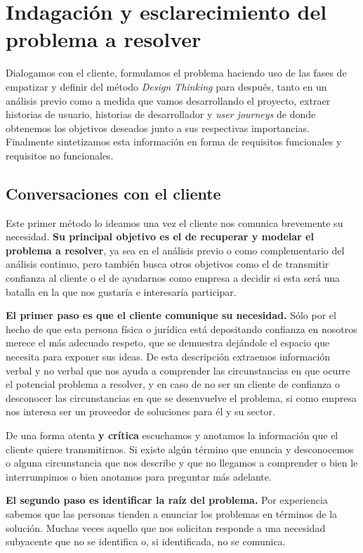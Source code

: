 \section{Indagación y esclarecimiento del problema a resolver}

Dialogamos con el cliente, formulamos el problema haciendo uso de las fases de
empatizar y definir del método \textit{Design Thinking} para después, tanto en un análisis
previo como a medida que vamos desarrollando el proyecto, extraer historias de usuario, historias de
desarrollador y \textit{user journeys} de donde obtenemos los objetivos deseados
junto a sus respectivas importancias.
Finalmente sintetizamos esta información en forma de requisitos funcionales y
requisitos no funcionales.

\subsection{Conversaciones con el cliente}

Este primer método lo ideamos una vez el cliente nos comunica brevemente su necesidad.
\textbf{Su principal objetivo es el de recuperar y modelar el problema a resolver}, ya sea en
el análisis previo o como complementario del análisis continuo, pero también busca
otros objetivos como el de transmitir confianza al cliente o el de ayudarnos como empresa a
decidir si esta será una batalla en la que nos gustaría e interesaría participar.

\textbf{El primer paso es que el cliente comunique su necesidad.} Sólo por el hecho de que esta
persona física o jurídica está depositando confianza en nosotros merece el más
adecuado respeto, que se demuestra dejándole el espacio que necesita para exponer
sus ideas. De esta descripción extraemos información verbal y
no verbal que nos ayuda a comprender las circunstancias en que ocurre el potencial
problema a resolver, y en caso de no ser un cliente de confianza o desconocer las
circunstancias en que se desenvuelve el problema, si como empresa nos interesa
ser un proveedor de soluciones para él y su sector.

De una forma atenta \textbf{y crítica} escuchamos y anotamos la información que el
cliente quiere transmitirnos. Si existe algún término que enuncia y desconocemos
o alguna circunstancia que nos describe y que no llegamos a comprender o bien le
interrumpimos o bien anotamos para preguntar más adelante.

\textbf{El segundo paso es identificar la raíz del problema.} Por experiencia sabemos
que las personas tienden a enunciar los problemas en términos de la solución.
Muchas veces aquello que nos solicitan responde a una necesidad subyacente que no
se identifica o, si identificada, no se comunica.

